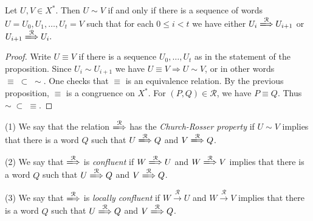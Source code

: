 \begin{prop}\label{wordseq} Let $U,V\in X^*$. Then $U\sim V$ if and only if
    there is a sequence of words $U = U_0, U_1, \dots, U_t = V$ such that for
    each $0 \le i < t$ we have either $U_i \xLongrightarrow{\mathcal{R}}
    U_{i+1}$ or $U_{i+1} \xLongrightarrow{\mathcal{R}} U_i.$
\end{prop}
\begin{proof} Write $U\equiv V$ if there is a sequence $U_0, \dots, U_t$ as in
    the statement of the proposition. Since $U_i \sim U_{i+1}$ we have $U\equiv
    V \Rightarrow U\sim V$, or in other words $\equiv \; \subset \; \sim$. One
    checks that $\equiv$ is an equivalence relation. By the previous
    proposition, $\equiv$ is a congruence on $X^*$. For $(P,Q)\in \mathcal{R}$,
    we have $P\equiv Q$. Thus $\sim \; \subset \; \equiv$.
\end{proof}

\begin{defns} (1) We say that the relation $\xLongrightarrow{\mathcal{R}}$ has
    the \emph{Church-Rosser property} if $U\sim V$ implies that there is a word
    $Q$ such that $U\xLongrightarrow{\mathcal{R}} Q$ and $V
    \xLongrightarrow{\mathcal{R}} Q$.

    (2) We say that $\xLongrightarrow{\mathcal{R}}$ is \emph{confluent} if $W
    \xLongrightarrow{\mathcal{R}} U$ and $W \xLongrightarrow{\mathcal{R}} V$
    implies that there is a word $Q$ such that $U\xLongrightarrow{\mathcal{R}}
    Q$ and $V \xLongrightarrow{\mathcal{R}} Q$.

    (3) We say that $\xLongrightarrow{\mathcal{R}}$ is \emph{locally confluent}
    if $W \xrightarrow{\mathcal{R}} U$ and $W \xrightarrow{\mathcal{R}} V$
    implies that there is a word $Q$ such that $U \xLongrightarrow{\mathcal{R}}
    Q$ and $V \xLongrightarrow{\mathcal{R}} Q$.
\end{defns}

